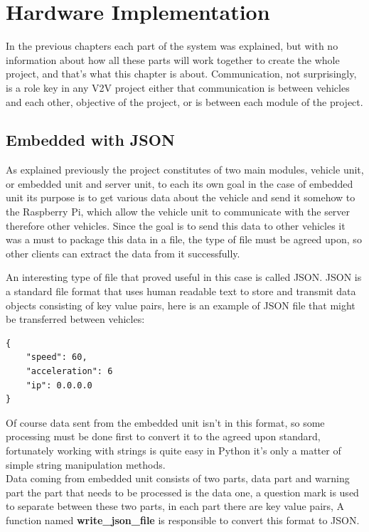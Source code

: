 \chapter{Hardware Implementation}

In the previous chapters each part of the system was explained, but with no information about how all these parts will work together to create the whole project, and that’s what this chapter is about. Communication, not surprisingly, is a role key in any V2V project either that communication is between vehicles and each other, objective of the project, or is between each module of the project.

\section{Embedded with JSON}
As explained previously the project constitutes of two main modules, vehicle unit, or embedded unit and server unit, to each its own goal in the case of embedded unit its purpose is to get various data about the vehicle and send it somehow to the Raspberry Pi, which allow the vehicle unit to communicate with the server therefore other vehicles. Since the goal is to send this data to other vehicles it was a must to package this data in a file, the type of file must be agreed upon, so other clients can extract the data from it successfully.

An interesting type of file that proved useful in this case is called JSON. JSON is a standard file format that uses human readable text to store and transmit data objects consisting of key value pairs, here is an example of JSON file that might be transferred between vehicles:



\begin{lstlisting}
{
	"speed": 60,
	"acceleration": 6
	"ip": 0.0.0.0
}

\end{lstlisting}

Of course data sent from the embedded unit isn’t in this format, so some processing must be done first to convert it to the agreed upon standard, fortunately working with strings is quite easy in Python it’s only a matter of simple string manipulation methods.\\

Data coming from embedded unit consists of two parts, data part and warning part the part that needs to be processed is the data one, a question mark is used to separate between these two parts, in each part there are key value pairs, A function named \textbf{write\_json\_file} is responsible to convert this format to JSON.

